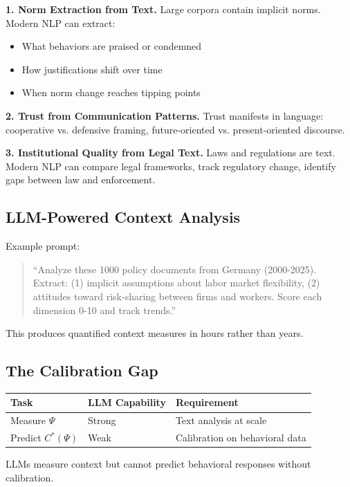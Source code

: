 \textbf{1. Norm Extraction from Text.}
Large corpora contain implicit norms. Modern NLP can extract:
\begin{itemize}[nosep]
  \item What behaviors are praised or condemned
  \item How justifications shift over time
  \item When norm change reaches tipping points
\end{itemize}

\textbf{2. Trust from Communication Patterns.}
Trust manifests in language: cooperative vs. defensive framing,
future-oriented vs. present-oriented discourse.

\textbf{3. Institutional Quality from Legal Text.}
Laws and regulations are text. Modern NLP can compare legal frameworks,
track regulatory change, identify gaps between law and enforcement.

\subsection{LLM-Powered Context Analysis}

\begin{intuition}
Example prompt:
\begin{quote}
``Analyze these 1000 policy documents from Germany (2000-2025).
Extract: (1) implicit assumptions about labor market flexibility,
(2) attitudes toward risk-sharing between firms and workers.
Score each dimension 0-10 and track trends.''
\end{quote}
This produces quantified context measures in hours rather than years.
\end{intuition}

\subsection{The Calibration Gap}

\begin{definition}
\begin{center}
\begin{tabular}{lll}
\toprule
\textbf{Task} & \textbf{LLM Capability} & \textbf{Requirement} \\
\midrule
Measure $\Psi$ & Strong & Text analysis at scale \\
Predict $C^*(\Psi)$ & Weak & Calibration on behavioral data \\
\bottomrule
\end{tabular}
\end{center}
LLMs measure context but cannot predict behavioral responses without calibration.
\end{definition}

